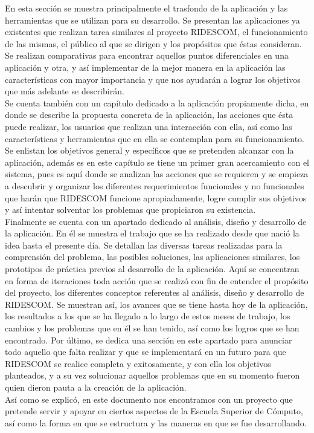 	En esta sección se muestra principalmente el trasfondo de la aplicación y las herramientas que se utilizan para su desarrollo. Se presentan las aplicaciones ya existentes que realizan tarea similares al proyecto RIDESCOM, el funcionamiento de las mismas, el público al que se dirigen y los propósitos que éstas consideran. Se realizan comparativas para encontrar aquellos puntos diferenciales en una aplicación y otra, y así implementar de la mejor manera en la aplicación las características con mayor importancia y que nos ayudarán a lograr los objetivos que más adelante se describirán.\\
	Se cuenta también con un capítulo dedicado a la aplicación propiamente dicha, en donde se describe la propuesta concreta de la aplicación, las acciones que ésta puede realizar, los usuarios que realizan una interacción con ella, así como las características y herramientas que en ella se contemplan para su funcionamiento. Se enlistan los objetivos general y específicos que se pretenden alcanzar con la aplicación, además es en este capítulo se tiene un primer gran acercamiento con el sistema, pues es aquí donde se analizan las acciones que se requieren y se empieza a descubrir y organizar los diferentes requerimientos funcionales y no funcionales que harán que RIDESCOM funcione apropiadamente, logre cumplir sus objetivos y así intentar solventar los problemas que propiciaron su existencia.\\
	Finalmente se cuenta con un apartado dedicado al análisis, diseño y desarrollo de la aplicación. En él se muestra el trabajo que se ha realizado desde que nació la idea hasta el presente día. Se detallan las diversas tareas realizadas para la comprensión del problema, las posibles soluciones, las aplicaciones similares, los prototipos de práctica previos al desarrollo de la aplicación. Aquí se concentran en forma de iteraciones toda acción que se realizó con fin de entender el propósito del proyecto, los diferentes conceptos referentes al análisis, diseño y desarrollo de RIDESCOM. Se muestran así, los avances que se tiene hasta hoy de la aplicación, los resultados a los que se ha llegado a lo largo de estos meses de trabajo, los cambios y los problemas que en él se han tenido, así como los logros que se han encontrado. Por último, se dedica una sección en este apartado para anunciar todo aquello que falta realizar y que se implementará en un futuro para que RIDESCOM se realice completa y exitosamente, y con ella los objetivos planteados, y a su vez solucionar aquellos problemas que en su momento fueron quien dieron pauta a la creación de la aplicación.\\
	Así como se explicó, en este documento nos encontramos con un proyecto que pretende servir y apoyar en ciertos aspectos de la Escuela Superior de Cómputo, así como la forma en que se estructura y las maneras en que se fue desarrollando.
	
